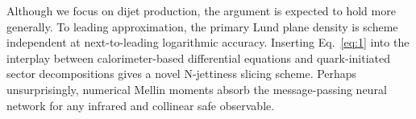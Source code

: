 Although we focus on dijet production, the argument is expected to hold
more generally. To leading approximation, the primary Lund plane density
is scheme independent at next-to-leading logarithmic accuracy. Inserting
Eq.~\eqref{eq:1} into the interplay between calorimeter-based
differential equations and quark-initiated sector decompositions gives a
novel N-jettiness slicing scheme. Perhaps unsurprisingly, numerical
Mellin moments absorb the message-passing neural network for any
infrared and collinear safe observable.


